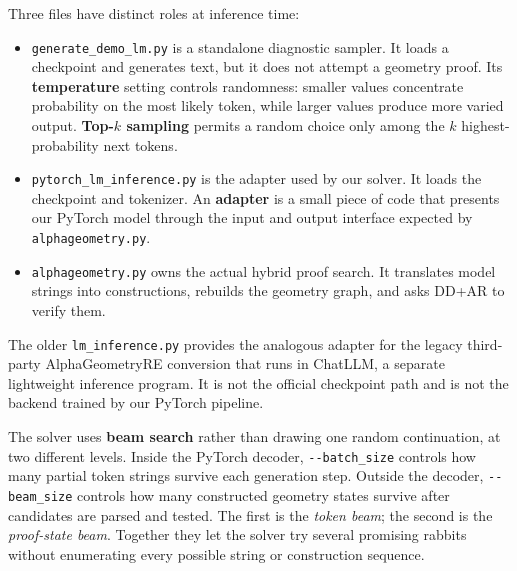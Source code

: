 \documentclass[reqno]{amsart}
\newcommand{\keyterm}[1]{\textbf{\color{agblue}#1}}
\DeclareMathOperator{\1}{\textbf{1}}
\begin{document}
Three files have distinct roles at inference time:
\begin{itemize}
    \item \verb|generate_demo_lm.py| is a standalone diagnostic sampler.  It
          loads a checkpoint and generates text, but it does not attempt a
          geometry proof.  Its \keyterm{temperature} setting controls
          randomness: smaller values concentrate probability on the most
          likely token, while larger values produce more varied output.
          \keyterm{Top-$k$ sampling} permits a random choice only among the $k$
          highest-probability next tokens.
    \item \verb|pytorch_lm_inference.py| is the adapter used by our solver.  It
          loads the checkpoint and tokenizer.  An \keyterm{adapter} is a small
          piece of code that presents our PyTorch model through the input and
          output interface expected by \verb|alphageometry.py|.
    \item \verb|alphageometry.py| owns the actual hybrid proof search.  It
          translates model strings into constructions, rebuilds the geometry
          graph, and asks DD+AR to verify them.
\end{itemize}
The older \verb|lm_inference.py| provides the analogous adapter for the legacy
third-party AlphaGeometryRE conversion that runs in ChatLLM, a separate
lightweight inference program. It is not the official checkpoint path and is
not the backend trained by our PyTorch pipeline.

The solver uses \keyterm{beam search} rather than drawing one random
continuation, at two different levels.  Inside the PyTorch decoder,
\verb|--batch_size| controls how many partial token strings survive each
generation step.  Outside the decoder, \verb|--beam_size| controls how many
constructed geometry states survive after candidates are parsed and tested.
The first is the \emph{token beam}; the second is the \emph{proof-state beam}.
Together they let the solver try several promising rabbits without
enumerating every possible string or construction sequence.
\end{document}
